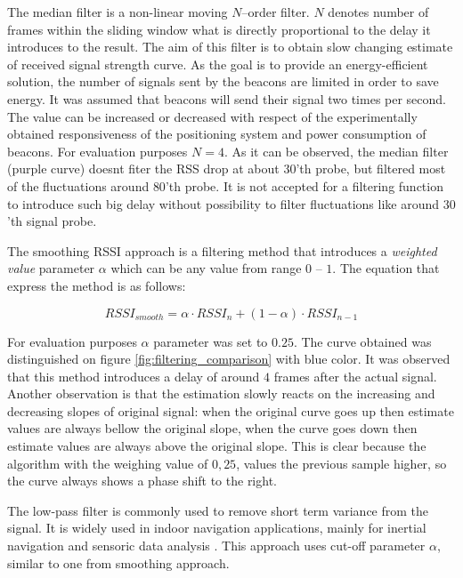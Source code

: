 \documentclass[../main.tex]{subfiles}
\begin{document}
The median filter is a non-linear moving $N$--order filter. $N$ denotes number of frames within the sliding window what is directly proportional to the delay it introduces to the result. The aim of this filter is to obtain slow changing estimate of received signal strength curve. As the goal is to provide an energy-efficient solution, the number of signals sent by the beacons are limited in order to save energy. It was assumed that beacons will send their signal two times per second. The value can be increased or decreased with respect of the experimentally obtained responsiveness of the positioning system and power consumption of beacons. For evaluation purposes $N=4$. As it can be observed, the median filter (purple curve) doesnt fiter the RSS drop at about $30$'th probe, but filtered most of the fluctuations around $80$'th probe. It is not accepted for a filtering function to introduce such big delay without possibility to filter fluctuations like around $30$'th signal probe.

The smoothing RSSI approach \cite{rssi_smoothing} is a filtering method that introduces a \textit{weighted value} parameter $\alpha$ which can be any value from range $0$ -- $1$. The equation that express the method is as follows:

\begin{equation}
\label{eq:rssi_smoothing}
	RSSI_{smooth} = \alpha \cdot RSSI_n + (1 - \alpha) \cdot RSSI_{n-1}
\end{equation}

For evaluation purposes $\alpha$ parameter was set to $0.25$. The curve obtained was distinguished on figure \ref{fig:filtering_comparison} with blue color. It was observed that this method introduces a delay of around $4$ frames after the actual signal. Another observation is that the estimation slowly reacts on the increasing and decreasing slopes of original signal: when the original curve goes up then estimate values are always bellow the original slope, when the curve goes down then estimate values are always above the original slope. This is clear because the algorithm with the weighing value of $0,25$, values the previous sample higher, so the curve always shows a phase shift to the right.

The low-pass filter is commonly used to remove short term variance from the signal. It is widely used in indoor navigation applications, mainly for inertial navigation and sensoric data analysis \cite{indoor_positioning_for_ar}\cite{indoor_navi_for_android2}\cite{report_indoor_navi_for_smartphones}\cite{thesis_ins_algorithms_for_android}\cite{indoor_positioning_for_ar_PhD_GOOD}. This approach uses cut-off parameter $\alpha$, similar to one from smoothing approach.
\end{document}
